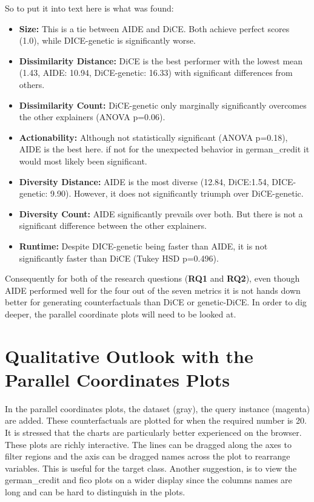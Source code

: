 So to put it into text here is what was found:
\begin{itemize}
    \item \textbf{Size:} This is a tie between AIDE and DiCE. Both achieve perfect scores (1.0), while DICE-genetic is significantly worse. 
    \item \textbf{Dissimilarity Distance:} DiCE is the best performer with the lowest mean (1.43, AIDE: 10.94, DiCE-genetic: 16.33) with significant differences from others.
    \item \textbf{Dissimilarity Count:} DiCE-genetic only marginally significantly overcomes the other explainers (ANOVA p=0.06).
    \item \textbf{Actionability:} Although not statistically significant (ANOVA p=0.18), AIDE is the best here. if not for the unexpected behavior in german\_credit it would most likely been significant.
    \item \textbf{Diversity Distance:} AIDE is the most diverse (12.84, DiCE:1.54, DICE-genetic: 9.90). However, it does not significantly triumph over DiCE-genetic.
    \item \textbf{Diversity Count:} AIDE significantly prevails over both. But there is not a significant difference between the other explainers.
    \item \textbf{Runtime:} Despite DICE-genetic being faster than AIDE, it is not significantly faster than DiCE (Tukey HSD p=0.496).
\end{itemize}

Consequently for both of the research questions (\textbf{RQ1} and \textbf{RQ2}), even though AIDE performed well for the four out of the seven metrics it is not hands down better for generating counterfactuals than DiCE or genetic-DiCE. In order to dig deeper, the parallel coordinate plots will need to be looked at.

\section{Qualitative Outlook with the Parallel Coordinates Plots}
In the parallel coordinates plots, the dataset (gray), the query instance (magenta) are added. These counterfactuals are plotted for when the required number is 20. It is stressed that the charts are particularly better experienced on the browser. These plots are richly interactive. The lines can be dragged along the axes to filter regions and the axis can be dragged names across the plot to rearrange variables. This is useful for the target class. Another suggestion, is to view the german\_credit and fico plots on a wider display since the columns names are long and can be hard to distinguish in the plots.

